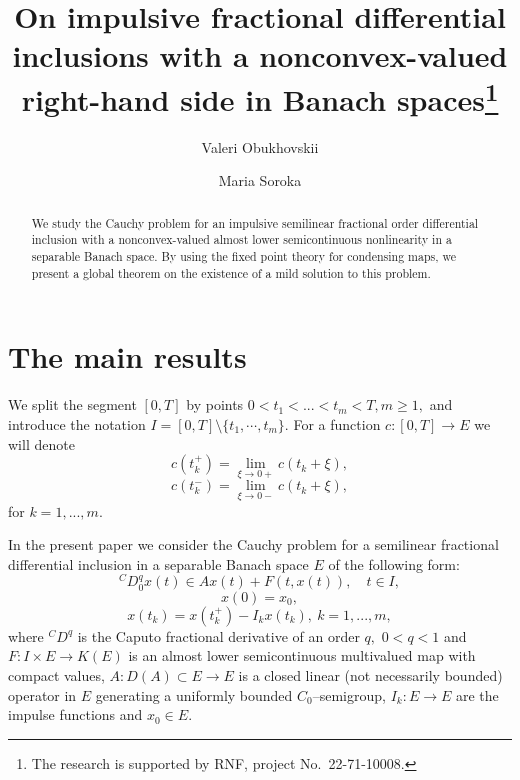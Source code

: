 \documentclass[12pt]{llncs}
\begin{document}
\fi
%
\title{On impulsive fractional differential inclusions with a nonconvex-valued right-hand side in Banach spaces\thanks{The research is supported by RNF, project No.~22-71-10008.}}
\author{Valeri Obukhovskii \and Maria Soroka 
}

\maketitle

\begin{abstract}
We study the Cauchy problem for an impulsive semilinear fractional order differential inclusion with a nonconvex-valued almost lower semicontinuous nonlinearity in a separable Banach space.
By using the fixed point theory for condensing maps, we present a global theorem on the existence of a mild solution to this problem.

\end{abstract}

\section{The main results}

We split the segment $[0,T] $ by points $0< t_{1}<...<t_{m}<T, m\geq 1,$ and introduce the notation $I=[0,T]\setminus \lbrace t_{1}, \cdots , t_{m}\rbrace.$ For a function $c:[0,T]\rightarrow E$ we will denote
$$
c(t_{k}^{+})=\lim_{\xi\rightarrow 0+}c(t_{k}+\xi),$$
$$  c(t_{k}^{-})=\lim_{\xi\rightarrow 0-}c(t_{k}+\xi),$$
for $  k=1,...,m.$


In the present paper we consider the Cauchy problem for a semilinear fractional differential inclusion in a separable Banach space $E$ of the following form:
\begin{equation}
\label{eq:p:1}
^{C}D^{q}_0 x(t)\in Ax(t)+ F(t,x(t)),\quad t\in I,
\end{equation}
\begin{equation}
\label{eq:p:2}
x(0)=x_{0},
\end{equation}
\begin{equation}
\label{eq:p:3}
x(t_k)=x(t^+_k)-I_{k}x(t_k), \ k=1,...,m,
\end{equation}
where $^{C}D^{q}$ is the Caputo fractional derivative of an order $q,$ $0 < q < 1$ and $F: I \times  E \to K(E)$ is an almost lower semicontinuous multivalued map with compact values, $A:D(A)\subset E \rightarrow E$ is a closed linear (not necessarily bounded) operator in $E$ generating a uniformly bounded $C_{0}$--semigroup, $I_{k}: E\to E$ are the impulse functions and $x_{0}\in E.$
\end{document}
